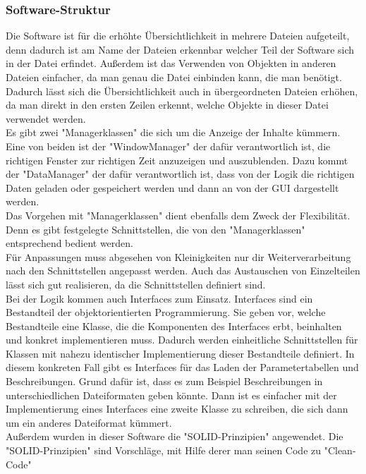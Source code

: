 \documentclass[a4paper,12pt,top=2.5cm,bottom=2.5cm, left=2.5cm, right=2.5cm, numbers=noenddot]{scrartcl}
\begin{document}
\subsubsection{Software-Struktur}
Die Software ist für die erhöhte Übersichtlichkeit in mehrere Dateien aufgeteilt, denn dadurch ist am Name der Dateien erkennbar welcher Teil der Software sich in der Datei erfindet. Außerdem ist das Verwenden von Objekten in anderen Dateien einfacher, da man genau die Datei einbinden kann, die man benötigt. Dadurch lässt sich die Übersichtlichkeit auch in übergeordneten Dateien erhöhen, da man direkt in den ersten Zeilen erkennt, welche Objekte in dieser Datei verwendet werden.\\
Es gibt zwei "Managerklassen" die sich um die Anzeige der Inhalte kümmern. Eine von beiden ist der "WindowManager" der dafür verantwortlich ist, die richtigen Fenster zur richtigen Zeit anzuzeigen und auszublenden. Dazu kommt der "DataManager" der dafür verantwortlich ist, dass von der Logik die richtigen Daten geladen oder gespeichert werden und dann an von der GUI dargestellt werden. \\
Das Vorgehen mit "Managerklassen" dient ebenfalls dem Zweck der Flexibilität. Denn es gibt festgelegte Schnittstellen, die von den "Managerklassen" entsprechend bedient werden. \\
Für Anpassungen muss abgesehen von Kleinigkeiten nur dir Weiterverarbeitung nach den Schnittstellen angepasst werden. Auch das Austauschen von Einzelteilen lässt sich gut realisieren, da die Schnittstellen definiert sind. \\
Bei der Logik kommen auch Interfaces zum Einsatz. Interfaces sind ein Bestandteil der objektorientierten Programmierung. Sie geben vor, welche Bestandteile eine Klasse, die die Komponenten des Interfaces erbt, beinhalten und konkret implementieren muss. Dadurch werden einheitliche Schnittstellen für Klassen mit nahezu identischer Implementierung dieser Bestandteile definiert.  %
In diesem konkreten Fall gibt es Interfaces für das Laden der Parametertabellen und Beschreibungen. Grund dafür ist, dass es zum Beispiel Beschreibungen in unterschiedlichen Dateiformaten geben könnte. Dann ist es einfacher mit der Implementierung eines Interfaces eine zweite Klasse zu schreiben, die sich dann um ein anderes Dateiformat kümmert.\\
Außerdem wurden in dieser Software die "SOLID-Prinzipien" angewendet. Die "SOLID-Prinzipien" sind Vorschläge, mit Hilfe derer man seinen Code zu "Clean-Code"
\end{document}
